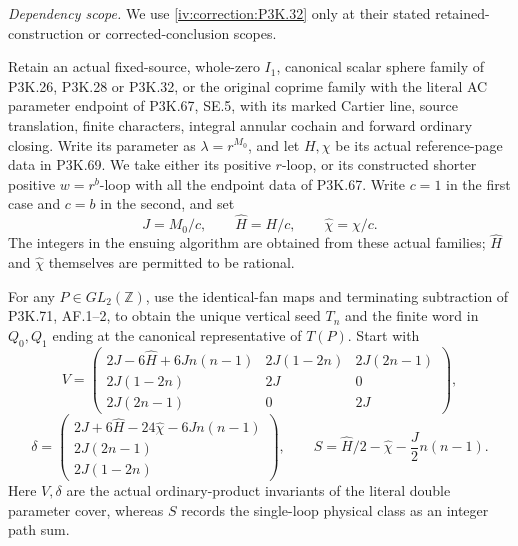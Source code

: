 \begin{theorem}\hypertarget{tag-02VL}{}\label{night:P3K.73}

\par\noindent\textit{Dependency scope.} We use \cref{iv:correction:P3K.32} only at their stated retained-construction or corrected-conclusion scopes.


Retain an actual fixed-source, whole-zero \(I_1\), canonical scalar
sphere family of P3K.26, P3K.28 or P3K.32, or the original coprime
family with the literal AC parameter endpoint of P3K.67, SE.5,
with its marked Cartier
line, source translation, finite characters, integral annular
cochain and forward ordinary closing. Write its parameter as
\(\lambda=r^{M_0}\), and let \(H,\chi\) be its actual reference-page
data in P3K.69. We take either its positive \(r\)-loop, or its
constructed shorter positive \(w=r^b\)-loop with all the endpoint
data of P3K.67. Write \(c=1\) in the first case and \(c=b\) in the
second, and set
\[
 J=M_0/c,\qquad \widehat H=H/c,\qquad
 \widehat\chi=\chi/c.
 \tag{P3K.73.1}
\]
The integers in the ensuing algorithm are obtained from these
actual families; \(\widehat H\) and \(\widehat\chi\) themselves
are permitted to be rational.

For any \(P\in GL_2(\mathbb Z)\), use the identical-fan maps and
terminating subtraction of P3K.71, AF.1--2, to obtain the unique
vertical seed \(T_n\) and the finite word in \(Q_0,Q_1\) ending
at the canonical representative of \(T(P)\). Start with
\[
 V=\begin{pmatrix}
 2J-6\widehat H+6Jn(n-1)&2J(1-2n)&2J(2n-1)\\
 2J(1-2n)&2J&0\\2J(2n-1)&0&2J
 \end{pmatrix},
\]
\[
 \delta=\begin{pmatrix}
 2J+6\widehat H-24\widehat\chi-6Jn(n-1)\\
 2J(2n-1)\\2J(1-2n)
 \end{pmatrix},\qquad
 S=\widehat H/2-\widehat\chi-\frac J2n(n-1).
 \tag{P3K.73.2}
\]
Here \(V,\delta\) are the actual ordinary-product invariants of
the literal double parameter cover, whereas \(S\) records the
single-loop physical class as an integer path sum.


\end{theorem}
